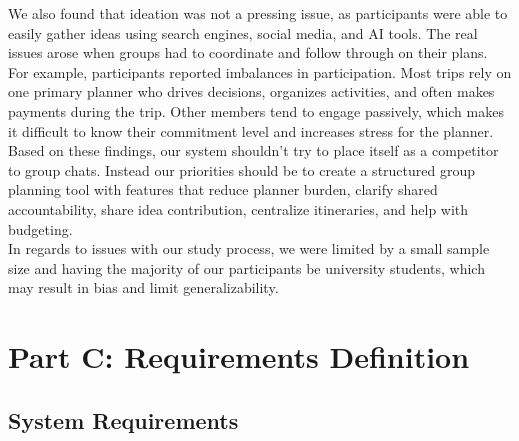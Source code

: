 \documentclass[12pt,a4paper]{article}
\begin{document}
We also found that ideation was not a pressing issue, as participants were able to easily gather ideas using search engines, social media, and AI tools. The real issues arose when groups had to coordinate and follow through on their plans. For example, participants reported imbalances in participation. Most trips rely on one primary planner who drives decisions, organizes activities, and often makes payments during the trip. Other members tend to engage passively, which makes it difficult to know their commitment level and increases stress for the planner.
\\

Based on these findings, our system shouldn’t try to place itself as a competitor to group chats. Instead our priorities should be to create a structured group planning tool with features that reduce planner burden, clarify shared accountability, share idea contribution, centralize itineraries, and help with budgeting. 
\\

In regards to issues with our study process, we were limited by a small sample size and having the majority of our participants be university students, which may result in bias and limit generalizability.

\newpage
\section{Part C: Requirements Definition}

\subsection{System Requirements}
\end{document}
